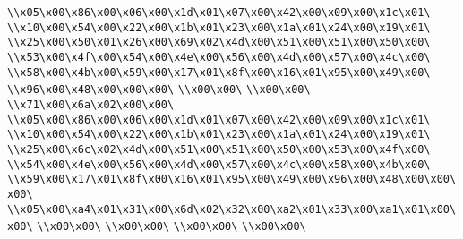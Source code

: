 \verb|\\x05\x00\x86\x00\x06\x00\x1d\x01\x07\x00\x42\x00\x09\x00\x1c\x01\|\newline
\verb|\\x10\x00\x54\x00\x22\x00\x1b\x01\x23\x00\x1a\x01\x24\x00\x19\x01\|\newline
\verb|\\x25\x00\x50\x01\x26\x00\x69\x02\x4d\x00\x51\x00\x51\x00\x50\x00\|\newline
\verb|\\x53\x00\x4f\x00\x54\x00\x4e\x00\x56\x00\x4d\x00\x57\x00\x4c\x00\|\newline
\verb|\\x58\x00\x4b\x00\x59\x00\x17\x01\x8f\x00\x16\x01\x95\x00\x49\x00\|\newline
\verb|\\x96\x00\x48\x00\x00\x00\|\newline
\verb|\\x00\x00\|\newline
\verb|\\x00\x00\|\newline
\verb|\\x71\x00\x6a\x02\x00\x00\|\newline
\verb|\\x05\x00\x86\x00\x06\x00\x1d\x01\x07\x00\x42\x00\x09\x00\x1c\x01\|\newline
\verb|\\x10\x00\x54\x00\x22\x00\x1b\x01\x23\x00\x1a\x01\x24\x00\x19\x01\|\newline
\verb|\\x25\x00\x6c\x02\x4d\x00\x51\x00\x51\x00\x50\x00\x53\x00\x4f\x00\|\newline
\verb|\\x54\x00\x4e\x00\x56\x00\x4d\x00\x57\x00\x4c\x00\x58\x00\x4b\x00\|\newline
\verb|\\x59\x00\x17\x01\x8f\x00\x16\x01\x95\x00\x49\x00\x96\x00\x48\x00\x00\x00\|\newline
\verb|\\x05\x00\xa4\x01\x31\x00\x6d\x02\x32\x00\xa2\x01\x33\x00\xa1\x01\x00\x00\|\newline
\verb|\\x00\x00\|\newline
\verb|\\x00\x00\|\newline
\verb|\\x00\x00\|\newline
\verb|\\x00\x00\|\newline
